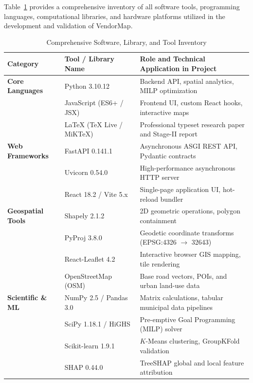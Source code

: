 Table~\ref{tab:tools_inventory} provides a comprehensive inventory of all software tools, programming languages, computational libraries, and hardware platforms utilized in the development and validation of VendorMap.

\begin{table}[htbp]
\caption{Comprehensive Software, Library, and Tool Inventory}
\label{tab:tools_inventory}
\centering
\small
\begin{tabularx}{\textwidth}{lp{}X}
\toprule
\textbf{Category} & \textbf{Tool / Library Name} & \textbf{Role and Technical Application in Project} \\
\midrule
\textbf{Core Languages} & Python 3.10.12 & Backend API, spatial analytics, MILP optimization \\
                         & JavaScript (ES6+ / JSX) & Frontend UI, custom React hooks, interactive maps \\
                         & \LaTeX{} (TeX Live / MiKTeX) & Professional typeset research paper and Stage-II report \\
\midrule
\textbf{Web Frameworks} & FastAPI 0.141.1 & Asynchronous ASGI REST API, Pydantic contracts \\
                         & Uvicorn 0.54.0 & High-performance asynchronous HTTP server \\
                         & React 18.2 / Vite 5.x & Single-page application UI, hot-reload bundler \\
\midrule
\textbf{Geospatial Tools}& Shapely 2.1.2 & 2D geometric operations, polygon containment \\
                         & PyProj 3.8.0 & Geodetic coordinate transforms (EPSG:4326 $\to$ 32643) \\
                         & React-Leaflet 4.2 & Interactive browser GIS mapping, tile rendering \\
                         & OpenStreetMap (OSM) & Base road vectors, POIs, and urban land-use data \\
\midrule
\textbf{Scientific \& ML}& NumPy 2.5 / Pandas 3.0 & Matrix calculations, tabular municipal data pipelines \\
                         & SciPy 1.18.1 / HiGHS & Pre-emptive Goal Programming (MILP) solver \\
                         & Scikit-learn 1.9.1 & $K$-Means clustering, GroupKFold validation \\
                         & SHAP 0.44.0 & TreeSHAP global and local feature attribution \\

\end{tabularx}
\end{table}
